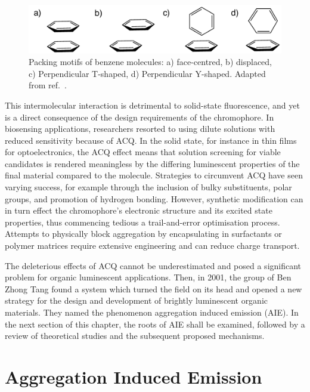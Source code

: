 \begin{figure}[H]
\centering
  \includegraphics[width=0.7\linewidth]{Intro/Stacking.pdf}
  \caption[Benzene Stacking Motifs]{Packing motifs of benzene molecules: a) face-centred, b) displaced, c) Perpendicular T-shaped, d) Perpendicular Y-shaped. Adapted from ref.~.}
  \label{figure: Benzene_Stacking}
\end{figure}


This intermolecular interaction is detrimental to solid-state fluorescence, and yet is a direct consequence of the design requirements of the chromophore. In biosensing applications, researchers resorted to using dilute solutions with reduced sensitivity because of ACQ.\cite{Thomas2007,Kwok2015} In the solid state, for instance in thin films for optoelectronics, the ACQ effect means that solution screening for viable candidates is rendered meaningless by the differing luminescent properties of the final material compared to the molecule. Strategies to circumvent ACQ have seen varying success, for example through the inclusion of bulky substituents, polar groups, and promotion of hydrogen bonding.\cite{Hong2009,Zhang2013,Mei2014,Mei2015} However, synthetic modification can in turn effect the chromophore's electronic structure and its excited state properties, thus commencing tedious a trail-and-error optimisation process. Attempts to physically block aggregation by encapsulating in surfactants or polymer matrices require extensive engineering and can reduce charge transport.\cite{Hong2009,Chen2000,Lee2013} 

The deleterious effects of ACQ cannot be underestimated and posed a significant problem for organic luminescent applications. Then, in 2001, the group of Ben Zhong Tang found a system which turned the field on its head and opened a new strategy for the design and development of brightly luminescent organic materials. They named the phenomenon aggregation induced emission (AIE). In the next section of this chapter, the roots of AIE shall be examined, followed by a review of theoretical studies and the subsequent proposed mechanisms.
\section{Aggregation Induced Emission}\label{section: lom AIE}

